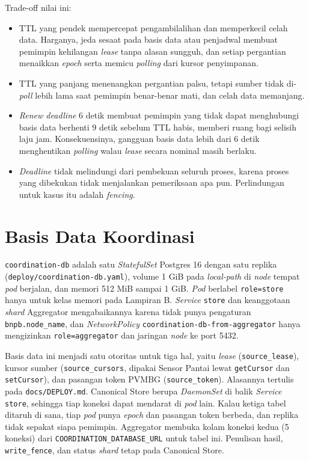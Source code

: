 Trade-off nilai ini:

\begin{itemize}
\item TTL yang pendek mempercepat pengambilalihan dan memperkecil celah data. Harganya, jeda sesaat pada basis data atau penjadwal membuat pemimpin kehilangan \textit{lease} tanpa alasan sungguh, dan setiap pergantian menaikkan \textit{epoch} serta memicu \textit{polling} dari kursor penyimpanan.
\item TTL yang panjang menenangkan pergantian palsu, tetapi sumber tidak di-\textit{poll} lebih lama saat pemimpin benar-benar mati, dan celah data memanjang.
\item \textit{Renew deadline} 6 detik membuat pemimpin yang tidak dapat menghubungi basis data berhenti 9 detik sebelum TTL habis, memberi ruang bagi selisih laju jam. Konsekuensinya, gangguan basis data lebih dari 6 detik menghentikan \textit{polling} walau \textit{lease} secara nominal masih berlaku.
\item \textit{Deadline} tidak melindungi dari pembekuan seluruh proses, karena proses yang dibekukan tidak menjalankan pemeriksaan apa pun. Perlindungan untuk kasus itu adalah \textit{fencing}.
\end{itemize}

\section{Basis Data Koordinasi}

\texttt{coordination-db} adalah satu \textit{StatefulSet} Postgres 16 dengan satu replika (\texttt{deploy/coordination-db.yaml}), volume 1 GiB pada \textit{local-path} di \textit{node} tempat \textit{pod} berjalan, dan memori 512 MiB sampai 1 GiB. \textit{Pod} berlabel \texttt{role=store} hanya untuk kelas memori pada Lampiran B. \textit{Service} \texttt{store} dan keanggotaan \textit{shard} Aggregator mengabaikannya karena tidak punya pengaturan \texttt{bnpb.node\_name}, dan \textit{NetworkPolicy} \texttt{coordination-db-from-aggregator} hanya mengizinkan \texttt{role=aggregator} dan jaringan \textit{node} ke port 5432.

Basis data ini menjadi satu otoritas untuk tiga hal, yaitu \textit{lease} (\texttt{source\_\allowbreak lease}), kursor sumber (\texttt{source\_\allowbreak cursors}, dipakai Sensor Pantai lewat \texttt{getCursor} dan \texttt{set\allowbreak Cursor}), dan pasangan token PVMBG (\texttt{source\_\allowbreak token}). Alasannya tertulis pada \texttt{docs/DEPLOY.md}. Canonical Store berupa \textit{DaemonSet} di balik \textit{Service} \texttt{store}, sehingga tiap koneksi dapat mendarat di \textit{pod} lain. Kalau ketiga tabel ditaruh di sana, tiap \textit{pod} punya \textit{epoch} dan pasangan token berbeda, dan replika tidak sepakat siapa pemimpin. Aggregator membuka kolam koneksi kedua (5 koneksi) dari \texttt{COORDINATION\_\allowbreak DATABASE\_\allowbreak URL} untuk tabel ini. Penulisan hasil, \texttt{write\_fence}, dan status \textit{shard} tetap pada Canonical Store.

